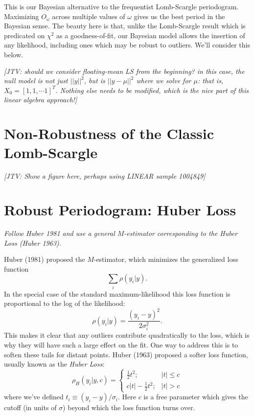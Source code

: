 \documentclass[12pt,pdftex]{article}
\newcommand{\jake}[1]{{\color{blue}\it[JTV: #1]}}
\begin{document}
This is our Bayesian alternative to the frequentist Lomb-Scargle periodogram.
Maximizing $O_\omega$ across multiple values of $\omega$ gives us the best period in the Bayesian sense.
The beauty here is that, unlike the Lomb-Scargle result which is predicated on $\chi^2$ as a goodness-of-fit, our Bayesian model allows the insertion of any likelihood, including ones which may be robust to outliers. We'll consider this below.

\jake{should we consider floating-mean LS from the beginning? in this case, the null model is not just $||y||^2$, but is $||y - \mu||^2$ where we solve for $\mu$: that is, $X_0 = [1, 1, \cdots 1]^T$. Nothing else needs to be modified, which is the nice part of this linear algebra approach!}

\section{Non-Robustness of the Classic Lomb-Scargle}

\jake{Show a figure here, perhaps using LINEAR sample 1004849}

\section{Robust Periodogram: Huber Loss}
{\it Follow Huber 1981 and use a general $M$-estimator corresponding to the Huber Loss (Huber 1963).}

Huber (1981) proposed the $M$-estimator, which minimizes the generalized loss function
\begin{equation}
  \sum_i \rho(y_i|y).
\end{equation}
In the special case of the standard maximum-likelihood this loss function is proportional to the log of the likelihood:
\begin{equation}
  \rho(y_i|y) = \frac{(y_i - y)^2}{2\sigma_i^2}.
\end{equation}
This makes it clear that any outliers contribute quadratically to the loss, which is why they will have such a large effect on the fit.
One way to address this is to soften these tails for distant points. Huber (1963) proposed a softer loss function, usually known as the {\it Huber Loss}:
\begin{equation}
  \rho_H(y_i|y,c) = \left\{
  \begin{array}{ll}
    \frac{1}{2}t^2; & |t| \le c \\
    c|t| - \frac{1}{2}t^2; & |t| > c
  \end{array}
  \right.
\end{equation}
where we've defined $t_i \equiv (y_i - y) / \sigma_i$. Here $c$ is a free parameter which gives the cutoff (in units of $\sigma$) beyond which the loss function turns over.
\end{document}
